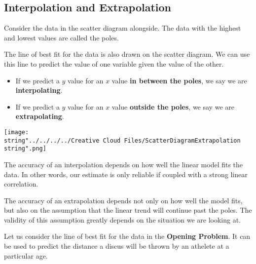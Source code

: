 \documentclass[11pt,a4paper]{book}
\begin{document}
\subsection{Interpolation and Extrapolation}

Consider the data in the scatter diagram alongside. The data with
the highest and lowest values are called the poles.

\begin{minipage}[t]{.5\textwidth}

The line of best fit for the data is also drawn on the scatter diagram.
We can use this line to predict the value of one variable given the
value of the other.
\begin{itemize}
\item If we predict a $y$ value for an $x$ value \textbf{in between the
poles}, we say we are \textbf{interpolating}.
\item If we predict a $y$ value for an $x$ value \textbf{outside the poles},
we say we are \textbf{extrapolating}.
\end{itemize}
\end{minipage}
\begin{minipage}[t]{.5\textwidth}
\begin{center}
\texttt{[image: \\string"../../../../Creative Cloud Files/ScatterDiagramExtrapolation\\string".png]}
\par\end{center}

\end{minipage}

The accuracy of an interpolation depends on how well the linear model
fits the data. In other words, our estimate is only reliable if coupled
with a strong linear correlation.

The accuracy of an extrapolation depends not only on how well the
model fits, but also on the assumption that the linear trend will
continue past the poles. The validity of this assumption greatly depends
on the situation we are looking at.

Let us consider the line of best fit for the data in the \textbf{Opening
Problem}. It can be used to predict the distance a discus will be
thrown by an athelete at a particular age.
\end{document}
